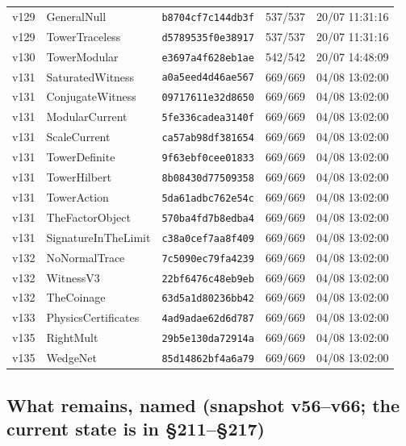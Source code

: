 \documentclass[11pt]{article}
\theoremstyle{definition}\newtheorem{deriv}{Derivation}
\begin{document}
{\begin{longtable}{@{}lllll@{}}
v129 & GeneralNull & \texttt{b8704cf7c144db3f} & 537/537 & 20/07 11:31:16 \\
v129 & TowerTraceless & \texttt{d5789535f0e38917} & 537/537 & 20/07 11:31:16 \\
v130 & TowerModular & \texttt{e3697a4f628eb1ae} & 542/542 & 20/07 14:48:09 \\
v131 & SaturatedWitness & \texttt{a0a5eed4d46ae567} & 669/669 & 04/08 13:02:00 \\
v131 & ConjugateWitness & \texttt{09717611e32d8650} & 669/669 & 04/08 13:02:00 \\
v131 & ModularCurrent & \texttt{5fe336cadea3140f} & 669/669 & 04/08 13:02:00 \\
v131 & ScaleCurrent & \texttt{ca57ab98df381654} & 669/669 & 04/08 13:02:00 \\
v131 & TowerDefinite & \texttt{9f63ebf0cee01833} & 669/669 & 04/08 13:02:00 \\
v131 & TowerHilbert & \texttt{8b08430d77509358} & 669/669 & 04/08 13:02:00 \\
v131 & TowerAction & \texttt{5da61adbc762e54c} & 669/669 & 04/08 13:02:00 \\
v131 & TheFactorObject & \texttt{570ba4fd7b8edba4} & 669/669 & 04/08 13:02:00 \\
v131 & SignatureInTheLimit & \texttt{c38a0cef7aa8f409} & 669/669 & 04/08 13:02:00 \\
v132 & NoNormalTrace & \texttt{7c5090ec79fa4239} & 669/669 & 04/08 13:02:00 \\
v132 & WitnessV3 & \texttt{22bf6476c48eb9eb} & 669/669 & 04/08 13:02:00 \\
v132 & TheCoinage & \texttt{63d5a1d80236bb42} & 669/669 & 04/08 13:02:00 \\
v133 & PhysicsCertificates & \texttt{4ad9adae62d6d787} & 669/669 & 04/08 13:02:00 \\
v135 & RightMult & \texttt{29b5e130da72914a} & 669/669 & 04/08 13:02:00 \\
v135 & WedgeNet & \texttt{85d14862bf4a6a79} & 669/669 & 04/08 13:02:00 \\
\bottomrule\end{longtable}}

\subsection*{What remains, named (snapshot v56--v66; the current state is in \S211--\S217)}
\end{document}
